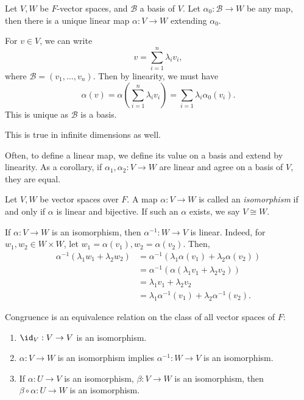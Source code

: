 \documentclass[12pt]{article}
\begin{document}
\begin{lemma}
	Let $V, W$ be $F$-vector spaces, and $\mathcal{B}$ a basis of $V$. Let $\alpha_0 : \mathcal{B} \to W$ be any map, then there is a unique linear map $\alpha : V \to W$ extending $\alpha_0$.
\end{lemma}

\begin{proofbox}
	For $v \in V$, we can write
\[
v = \sum_{i = 1}^{n} \lambda_i v_i
,\]
where $\mathcal{B} = (v_1, \ldots, v_n)$. Then by linearity, we must have
\[
	\alpha(v) = \alpha \left( \sum_{i = 1}^{n} \lambda_i v_i \right) = \sum_{i = 1}^{}\lambda_i \alpha_0 (v_i)
.\]
This is unique as $\mathcal{B}$ is a basis.
\end{proofbox}

\begin{remark}
	This is true in infinite dimensions as well.
\end{remark}

Often, to define a linear map, we define its value on a basis and extend by linearity. As a corollary, if $\alpha_1, \alpha_2 : V \to W$ are linear and agree on a basis of $V$, they are equal.

\begin{definition}[Isomorphism]
	Let $V, W$ be vector spaces over $F$. A map $\alpha : V \to W$ is called an \textit{isomorphism} if and only if $\alpha$ is linear and bijective. If such an $\alpha$ exists, we say $V \cong W$.
\end{definition}

\begin{remark}
	If $\alpha : V \to W$ is an isomorphism, then $\alpha^{-1} : W \to V$ is linear. Indeed, for $w_1, w_2 \in W \times W$, let $w_1 = \alpha(v_1), w_2 = \alpha(v_2)$. Then,
	\begin{align*}
		\alpha^{-1}(\lambda_1 w_1 + \lambda_2 w_2) &= \alpha^{-1}(\lambda_1 \alpha(v_1) + \lambda_2 \alpha(v_2)) \\
							   &= \alpha^{-1} ( \alpha(\lambda_1 v_1 + \lambda_2 v_2) ) \\
							   &= \lambda_1 v_1 + \lambda_2 v_2 \\
							   &= \lambda_1 \alpha^{-1}(v_1) + \lambda_2 \alpha^{-1}(v_2).
	\end{align*}
\end{remark}

\begin{lemma}
	Congruence is an equivalence relation on the class of all vector spaces of $F$:
	\begin{enumerate}[\normalfont(i)]
		\item $\id_V : V \to V$ is an isomorphism.
		\item $\alpha : V \to W$ is an isomorphism implies $\alpha^{-1} : W \to V$ is an isomorphism.
		\item If $\alpha : U \to V$ is an isomorphism, $\beta : V \to W$ is an isomorphism, then $\beta \circ \alpha : U \to W$ is an isomorphism.
	\end{enumerate}
\end{lemma}
\end{document}
